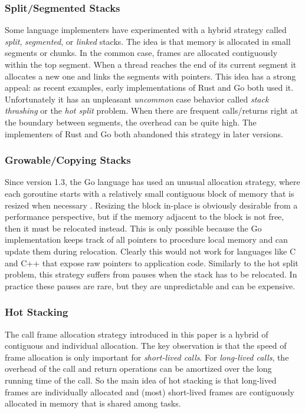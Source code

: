 \documentclass[acmsmall,anonymous,review]{acmart}\settopmatter{printfolios=true,printccs=false,printacmref=false}
\begin{document}
\subsubsection{Split/Segmented Stacks}

Some language implementers have experimented with a hybrid strategy called \emph{split}, \emph{segmented}, or \emph{linked} stacks.
The idea is that memory is allocated in small segments or chunks.
In the common case, frames are allocated contiguously within the top segment.
When a thread reaches the end of its current segment it allocates a new one and links the segments with pointers.
This idea has a strong appeal: as recent examples, early implementations of Rust and Go both used it.
Unfortunately it has an unpleasant \emph{uncommon} case behavior called \emph{stack thrashing} or the \emph{hot split} problem.
When there are frequent calls/returns right at the boundary between segments, the overhead can be quite high.
The implementers of Rust \cite{Anderson2013} and Go \cite{Anastasopoulos2014} both abandoned this strategy in later versions.


\subsubsection{Growable/Copying Stacks}
\label{sec:go_stacks}

Since version 1.3, the Go language has used an unusual allocation strategy, where each goroutine starts with a relatively small contiguous block of memory that is resized when necessary \cite{Cheney2014, Morsing2014}.
Resizing the block in-place is obviously desirable from a performance perspective, but if the memory adjacent to the block is not free, then it must be relocated instead.
This is only possible because the Go implementation keeps track of all pointers to procedure local memory and can update them during relocation.
Clearly this would not work for languages like C and C++ that expose raw pointers to application code.
Similarly to the hot split problem, this strategy suffers from pauses when the stack has to be relocated.
In practice these pauses are rare, but they are unpredictable and can be expensive.

\subsubsection{Hot Stacking}

The call frame allocation strategy introduced in this paper is a hybrid of contiguous and individual allocation.
The key observation is that the speed of frame allocation is only important for \emph{short-lived calls}.
For \emph{long-lived calls}, the overhead of the call and return operations can be amortized over the long running time of the call.
So the main idea of hot stacking is that long-lived frames are individually allocated and (most) short-lived frames are contiguously allocated in memory that is shared among tasks.
\end{document}
